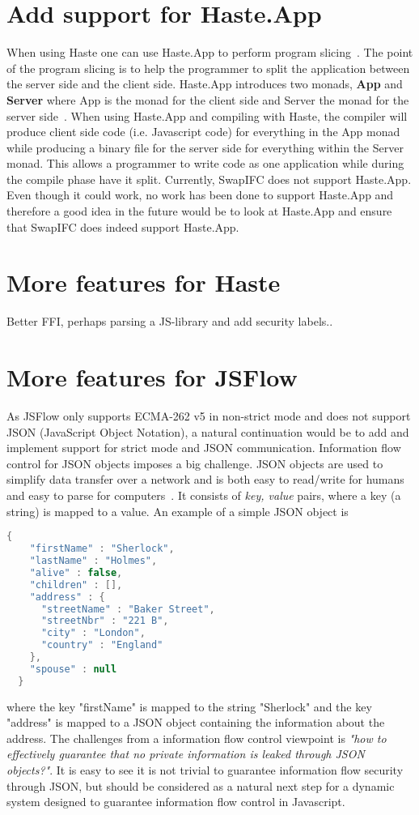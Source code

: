 \section{Add support for Haste.App}
When using Haste one can use Haste.App to perform program slicing~\cite{haste-symposium}. The point of the program slicing is to help the programmer to split the application between the server side and the client side. Haste.App introduces two monads, \textbf{App} and \textbf{Server} where App is the monad for the client side and Server the monad for the server side~\cite{haste-app}. When using Haste.App and compiling with Haste, the compiler will produce client side code (i.e. Javascript code) for everything in the App monad while producing a binary file for the server side for everything within the Server monad. This allows a programmer to write code as one application while during the compile phase have it split. Currently, SwapIFC does not support Haste.App. Even though it could work, no work has been done to support Haste.App and therefore a good idea in the future would be to look at Haste.App and ensure that SwapIFC does indeed support Haste.App.

\section{More features for Haste}
Better FFI, perhaps parsing a JS-library and add security labels..

\section{More features for JSFlow}
As JSFlow only supports ECMA-262 v5 in non-strict mode and does not support JSON (JavaScript Object Notation), a natural continuation would be to add and implement support for strict mode and JSON communication. Information flow control for JSON objects imposes a big challenge. JSON objects are used to simplify data transfer over a network and is both easy to read/write for humans and easy to parse for computers~\cite{json}. It consists of \emph{key, value} pairs, where a key (a string) is mapped to a value. An example of a simple JSON object is
\begin{lstlisting}[language=Java]
  {
    "firstName" : "Sherlock",
    "lastName" : "Holmes",
    "alive" : false,
    "children" : [],
    "address" : {
      "streetName" : "Baker Street",
      "streetNbr" : "221 B",
      "city" : "London",
      "country" : "England"
    },
    "spouse" : null
  }
\end{lstlisting}
where the key "firstName" is mapped to the string "Sherlock" and the key "address" is mapped to a JSON object containing the information about the address. The challenges from a information flow control viewpoint is \emph{"how to effectively guarantee that no private information is leaked through JSON objects?"}. It is easy to see it is not trivial to guarantee information flow security through JSON, but should be considered as a natural next step for a dynamic system designed to guarantee information flow control in Javascript.

